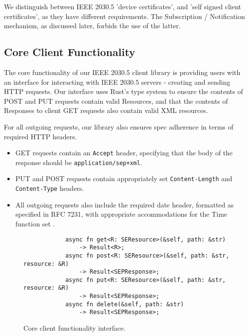 We distinguish between IEEE 2030.5 'device certificates', and 'self signed client certificates', as they have different requirements. The Subscription / Notification mechanism, as discussed later, forbids the use of the latter.

\subsection{Core Client Functionality}
The core functionality of our IEEE 2030.5 client library is providing users with an interface for interacting with IEEE 2030.5 servers - creating and sending HTTP requests.
Our interface uses Rust's type system to ensure the contents of POST and PUT requests contain valid Resources, and that the contents of Responses to client GET requests also contain valid XML resources.

For all outgoing requests, our library also ensures spec adherence in terms of required HTTP headers. 

\begin{itemize}
    \item GET requests contain an \texttt{Accept} header, specifying that the body of the response should be \texttt{application/sep+xml}.
    \item PUT and POST requests contain appropriately set \texttt{Content-Length} and \texttt{Content-Type} headers.
    \item All outgoing requests also include the required date header, formatted as specified in RFC 7231, with appropriate accommodations for the Time function set  \cite{rfc7231}.
\end{itemize}


\begin{figure}[h]
    \begin{center}
        \begin{lstlisting}
            async fn get<R: SEResource>(&self, path: &str) 
                -> Result<R>;
            async fn post<R: SEResource>(&self, path: &str, resource: &R) 
                -> Result<SEPResponse>;
            async fn put<R: SEResource>(&self, path: &str, resource: &R) 
                -> Result<SEPResponse>;
            async fn delete(&self, path: &str) 
                -> Result<SEPResponse>;
        \end{lstlisting}
        \label{fig:clientrequestinterface}
        \vspace{-10pt}
        \caption{Core client functionality interface.}
    \end{center}
\end{figure}

